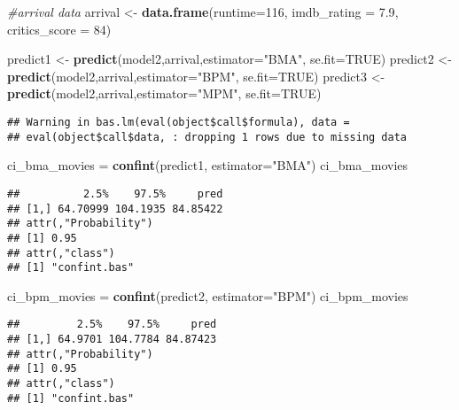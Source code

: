 \documentclass[]{article}
\newenvironment{Shaded}{\begin{snugshade}}{\end{snugshade}}
\newcommand{\KeywordTok}[1]{\textcolor[rgb]{0.13,0.29,0.53}{\textbf{#1}}}
\newcommand{\DataTypeTok}[1]{\textcolor[rgb]{0.13,0.29,0.53}{#1}}
\newcommand{\DecValTok}[1]{\textcolor[rgb]{0.00,0.00,0.81}{#1}}
\newcommand{\FloatTok}[1]{\textcolor[rgb]{0.00,0.00,0.81}{#1}}
\newcommand{\StringTok}[1]{\textcolor[rgb]{0.31,0.60,0.02}{#1}}
\newcommand{\CommentTok}[1]{\textcolor[rgb]{0.56,0.35,0.01}{\textit{#1}}}
\newcommand{\OtherTok}[1]{\textcolor[rgb]{0.56,0.35,0.01}{#1}}
\newcommand{\NormalTok}[1]{#1}
\begin{document}
\begin{Shaded}
\begin{Highlighting}[]
\CommentTok{#arrival data}
\NormalTok{arrival <-}\StringTok{ }\KeywordTok{data.frame}\NormalTok{(}\DataTypeTok{runtime=}\DecValTok{116}\NormalTok{, }\DataTypeTok{imdb_rating =} \FloatTok{7.9}\NormalTok{, }\DataTypeTok{critics_score =} \DecValTok{84}\NormalTok{)}

\NormalTok{predict1 <-}\StringTok{ }\KeywordTok{predict}\NormalTok{(model2,arrival,}\DataTypeTok{estimator=}\StringTok{"BMA"}\NormalTok{, }\DataTypeTok{se.fit=}\OtherTok{TRUE}\NormalTok{)}
\NormalTok{predict2 <-}\StringTok{ }\KeywordTok{predict}\NormalTok{(model2,arrival,}\DataTypeTok{estimator=}\StringTok{"BPM"}\NormalTok{, }\DataTypeTok{se.fit=}\OtherTok{TRUE}\NormalTok{)}
\NormalTok{predict3 <-}\StringTok{ }\KeywordTok{predict}\NormalTok{(model2,arrival,}\DataTypeTok{estimator=}\StringTok{"MPM"}\NormalTok{, }\DataTypeTok{se.fit=}\OtherTok{TRUE}\NormalTok{)}
\end{Highlighting}
\end{Shaded}

\begin{verbatim}
## Warning in bas.lm(eval(object$call$formula), data =
## eval(object$call$data, : dropping 1 rows due to missing data
\end{verbatim}

\begin{Shaded}
\begin{Highlighting}[]
\NormalTok{ci_bma_movies =}\StringTok{ }\KeywordTok{confint}\NormalTok{(predict1, }\DataTypeTok{estimator=}\StringTok{"BMA"}\NormalTok{)}
\NormalTok{ci_bma_movies}
\end{Highlighting}
\end{Shaded}

\begin{verbatim}
##          2.5%    97.5%     pred
## [1,] 64.70999 104.1935 84.85422
## attr(,"Probability")
## [1] 0.95
## attr(,"class")
## [1] "confint.bas"
\end{verbatim}

\begin{Shaded}
\begin{Highlighting}[]
\NormalTok{ci_bpm_movies =}\StringTok{ }\KeywordTok{confint}\NormalTok{(predict2, }\DataTypeTok{estimator=}\StringTok{"BPM"}\NormalTok{)}
\NormalTok{ci_bpm_movies}
\end{Highlighting}
\end{Shaded}

\begin{verbatim}
##         2.5%    97.5%     pred
## [1,] 64.9701 104.7784 84.87423
## attr(,"Probability")
## [1] 0.95
## attr(,"class")
## [1] "confint.bas"
\end{verbatim}
\end{document}
